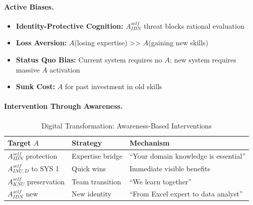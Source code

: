 \paragraph{Active Biases.}
\begin{itemize}
\item \textbf{Identity-Protective Cognition:} $A^{self}_{IDN}$ threat blocks 
rational evaluation
\item \textbf{Loss Aversion:} $A$(losing expertise) >> $A$(gaining new skills)
\item \textbf{Status Quo Bias:} Current system requires no $A$; new system 
requires massive $A$ activation
\item \textbf{Sunk Cost:} $A$ for past investment in old skills
\end{itemize}

\paragraph{Intervention Through Awareness.}

\begin{table}[htbp]
\centering
\caption{Digital Transformation: Awareness-Based Interventions}
\label{tab:digital-intervention}
\renewcommand{\arraystretch}{1.3}
\begin{tabular}{@{}lll@{}}
\toprule
\textbf{Target $A$} & \textbf{Strategy} & \textbf{Mechanism} \\
\midrule
$A^{self}_{IDN}$ protection & Expertise bridge & ``Your domain knowledge is essential'' \\
$A^{self}_{INU,D}$ to SYS 1 & Quick wins & Immediate visible benefits \\
$A^{self}_{KNU}$ preservation & Team transition & ``We learn together'' \\
$A^{self}_{IDN}$ new & New identity & ``From Excel expert to data analyst'' \\
\bottomrule
\end{tabular}
\end{table}

